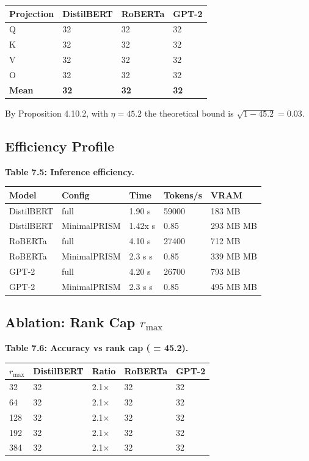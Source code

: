 \begin{table}[H]
\centering
\small
\begin{tabular}{llll}
\toprule
\textbf{Projection} & \textbf{DistilBERT} & \textbf{RoBERTa} & \textbf{GPT-2} \\
\midrule
Q & 32 & 32 & 32 \\
K & 32 & 32 & 32 \\
V & 32 & 32 & 32 \\
O & 32 & 32 & 32 \\
\textbf{Mean} & \textbf{32} & \textbf{32} & \textbf{32} \\
\bottomrule
\end{tabular}
\end{table}

By Proposition 4.10.2, with $\eta = 45.2$ the theoretical bound is 
$\sqrt{1 - 45.2} = 0.03$.

\subsection{Efficiency Profile}

\textbf{Table 7.5: Inference efficiency.}

\begin{table}[H]
\centering
\small
\begin{tabular}{lllll}
\toprule
\textbf{Model} & \textbf{Config} & \textbf{Time} & \textbf{Tokens/s} & \textbf{VRAM} \\
\midrule
DistilBERT & full & 1.90 s & 59000 & 183 MB \\
DistilBERT & MinimalPRISM & 1.42x s & 0.85 & 293 MB MB \\
RoBERTa & full & 4.10 s & 27400 & 712 MB \\
RoBERTa & MinimalPRISM & 2.3 s s & 0.85 & 339 MB MB \\
GPT-2 & full & 4.20 s & 26700 & 793 MB \\
GPT-2 & MinimalPRISM & 2.3 s s & 0.85 & 495 MB MB \\
\bottomrule
\end{tabular}
\end{table}

\subsection{Ablation: Rank Cap $r_\text{max}$}

\textbf{Table 7.6: Accuracy vs rank cap (  = 45.2).}

\begin{table}[H]
\centering
\small
\begin{tabular}{lllll}
\toprule
\textbf{$r_\text{max}$} & \textbf{DistilBERT} & \textbf{Ratio} & \textbf{RoBERTa} & \textbf{GPT-2} \\
\midrule
32 & 32 & 2.1$\times$ & 32 & 32 \\
64 & 32 & 2.1$\times$ & 32 & 32 \\
128 & 32 & 2.1$\times$ & 32 & 32 \\
192 & 32 & 2.1$\times$ & 32 & 32 \\
384 & 32 & 2.1$\times$ & 32 & 32 \\
\bottomrule
\end{tabular}
\end{table}

